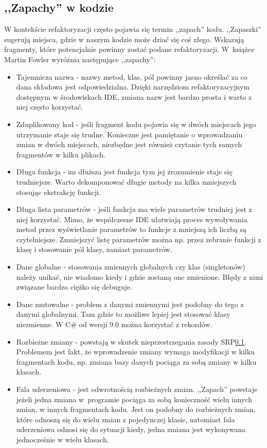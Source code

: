 \subsection{,,Zapachy'' w kodzie}
W kontekście refaktoryzacji często pojawia się termin ,,zapach'' kodu. ,,Zapaszki'' sugerują miejsca, gdzie w naszym kodzie może dziać się coś złego. Wskazują fragmenty, które potencjalnie powinny zostać podane refaktoryzacji. W~książce Martin Fowler wyróżnia następujące ,,zapachy'':
\begin{itemize}
	\item Tajemnicza nazwa - nazwy metod, klas, pól powinny jasno określać za co dana składowa jest odpowiedzialna. Dzięki narzędziom refaktoryzacyjnym dostępnym w środowiskach IDE, zmiana nazw jest bardzo prosta i warto z niej często korzystać.
	\item Zduplikowany kod - jeśli fragment kodu pojawia się w dwóch miejscach jego utrzymanie staje się trudne. Konieczne jest pamiętanie o wprowadzaniu zmian w dwóch miejscach, niezbędne jest również czytanie tych samych fragmentów w kilku plikach.
	\item Długa funkcja - im dłuższa jest funkcja tym jej zrozumienie staje się trudniejsze. Warto dekomponować długie metody na kilka mniejszych stosując ekstrakcję funkcji.
	\item Długa lista parametrów - jeśli funkcja ma wiele parametrów trudniej jest z niej korzystać. Mimo, że współczesne IDE ułatwiają proces wywoływania metod przez wyświetlanie parametrów to funkcje z mniejszą ich liczbą są czytelniejsze. Zmniejszyć listę parametrów można np. przez zebranie funkcji z klasę i stosowanie pól klasy, zamiast parametrów. 
	\item Dane globalne - stosowania zmiennych globalnych czy klas (singletonów) należy unikać, nie wiadomo kiedy i gdzie zostaną one zmienione. Błędy z nimi związane bardzo ciężko się debuguje. 
	\item Dane mutowalne - problem z danymi zmiennymi jest podobny do tego z danymi globalnymi. Tam gdzie to możliwe lepiej jest stosować klasy niezmienne. W C\# od wersji 9.0 można korzystać z rekordów.
	\item Rozbieżne zmiany - powstają w skutek nieprzestrzegania zasady SRP\ref{}. Problemem jest fakt, że wprowadzenie zmiany wymaga modyfikacji w kilku fragmentach kodu, np. zmiana bazy danych pociąga za sobą zmiany w kilku klasach.
	\item Fala uderzeniowa - jest odwrotnością rozbieżnych zmian. ,,Zapach'' powstaje jeżeli jedna zmiana w~programie pociąga za sobą konieczność wielu innych zmian, w innych fragmentach kodu. Jest on podobny do rozbieżnych zmian, które odnoszą się do wielu zmian z pojedynczej klasie, natomiast fala uderzeniowa odnosi się do sytuacji kiedy, jedna zmiana jest wykonywana jednocześnie w wielu klasach. 

\end{itemize}
